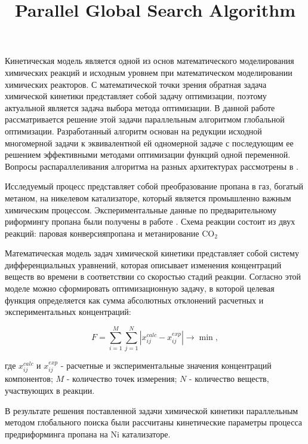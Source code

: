 \documentclass[11pt, oneside, a4paper]{article}
\begin{document}

\title{Parallel Global Search Algorithm }


Кинетическая модель является одной из основ математического моделирования химических реакций и исходным уровнем при математическом моделировании химических реакторов. С математической точки зрения обратная задача химической кинетики представляет собой задачу оптимизации, поэтому актуальной является задача выбора метода оптимизации.  В данной работе рассматривается решение этой задачи параллельным алгоритмом глобальной оптимизации.  Разработанный алгоритм основан на редукции исходной многомерной задачи к эквивалентной ей одномерной задаче с последующим ее решением эффективными методами оптимизации функций одной переменной. Вопросы распараллеливания алгоритма на разных архитектурах рассмотрены в \cite{Strongin13, Barkalov2016}. 

Исследуемый процесс представляет собой преобразование пропана в газ, богатый метаном, на никелевом катализаторе, который является промышленно важным химическим процессом. Экспериментальные данные по предварительному риформингу пропана были получены в работе \cite {Uskov2020}. Схема реакции состоит из двух реакций: паровая конверсияпропана и метанирование CO$_2$ 

Математическая модель задач химической кинетики представляет собой систему дифференциальных уравнений, которая описывает изменения концентраций веществ во времени в соответствии со скоростью стадий реакции. Согласно этой моделе можно сформировать оптимизационную задачу, в которой целевая функция определяется как сумма абсолютных отклонений расчетных и экспериментальных концентраций:

\begin{equation}\label{func}
F = \sum\limits_{i=1}^M \sum\limits_{j=1}^N \left| x_{ij}^{calc} - x_{ij}^{exp} \right| \rightarrow \min,
\end{equation}

где $ x_ {ij} ^ {calc} $ и $ x_ {ij} ^ {exp} $ - расчетные и экспериментальные значения концентраций компонентов; $ M $ - количество точек измерения; $ N $ - количество веществ, участвующих в реакции.


В результате решения поставленной задачи химической кинетики параллельным методом глобального поиска были рассчитаны кинетические параметры процесса предриформинга пропана на Ni катализаторе.
\end{document}
